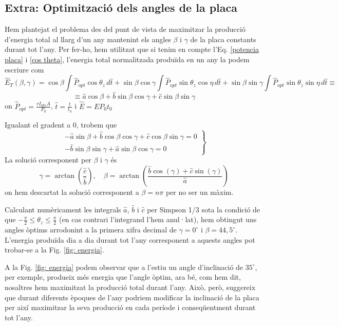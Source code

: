 \documentclass[11pt]{article}
\begin{document}
\subsection{Extra: Optimització dels angles de la placa}

Hem plantejat el problema des del punt de vista de maximitzar la producció d'energia total al llarg d'un any mantenint els angles $\beta$ i $\gamma$ de la placa constants durant tot l'any. Per fer-ho, hem utilitzat que si tenim en compte l'Eq. \ref{potencia placa} i \ref{cos theta}, l'energia total normalitzada produïda en un any la podem escriure com
\[
\hat{E}_T(\beta, \gamma) = \cos \beta \int \hat{P}_{opt} \cos \theta_{z} \, d\hat{t} + \sin \beta \cos \gamma \int \hat{P}_{opt} \sin \theta_{z} \cos \eta \, d\hat{t} + \sin \beta \sin \gamma \int \hat{P}_{opt} \sin \theta_{z} \sin \eta \, d\hat{t} \equiv
\]
\[
\equiv \hat{a}\cos \beta
+ \hat{b}\sin \beta \cos \gamma
+ \hat{c}\sin \beta \sin \gamma
\]
on $\hat{P}_{opt}=\frac{r I_{abs} A}{P_0}$, $\hat{t}=\frac{t}{t_0}$ i $\hat{E}=E P_0 t_0$

Igualant el gradent a 0, trobem que
\[
\left.
\begin{aligned}
-\hat{a}\sin \beta + \hat{b}\cos \beta \cos \gamma + \hat{c}\cos \beta \sin \gamma = 0 \\
-\hat{b}\sin \beta \sin \gamma + \hat{a}\sin \beta \cos \gamma = 0
\end{aligned}
\right\}
\]
La solució corresponent per $\beta$ i $\gamma$ és
\[
\gamma = \arctan\left(\frac{\hat{c}}{\hat{b}}\right), \quad \beta = \arctan\left(\frac{\hat{b} \cos(\gamma) + \hat{c} \sin(\gamma)}{\hat{a}}\right)
\]
on hem descartat la solució corresponent a $\beta=n\pi$ per no ser un màxim.

Calculant numèricament les integrals $\hat{a}$, $\hat{b}$ i $\hat{c}$ per Simpson 1/3 sota la condició de que $-\frac{\pi}{2} \leq \theta_z \leq \frac{\pi}{2}$ (en cas contrari l'integrand l'hem anul·lat), hem obtingut uns angles òptims arrodonint a la primera xifra decimal de $\gamma=0^\circ$ i $\beta=44,5^\circ$. L'energia produïda dia a dia durant tot l'any corresponent a aquests angles pot trobar-se a la Fig. \ref{fig: energia}. 

A la Fig. \ref{fig: energia} podem observar que a l'estiu un angle d'inclinació de $35^\circ$, per exemple, produeix més energia que l'angle òptim, ara bé, com hem dit, nosaltres hem maximitzat la producció total durant l'any. Això, però, suggereix que durant diferents èpoques de l'any podriem modificar la inclinació de la placa per així maximitzar la seva producció en cada període i conseqüentment durant tot l'any.
\end{document}
